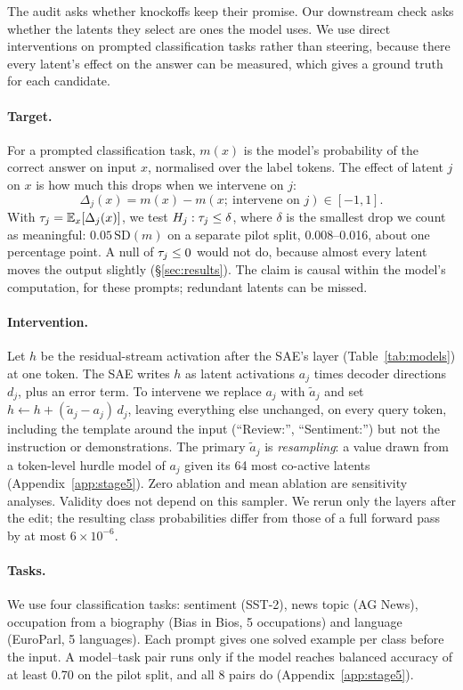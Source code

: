 The audit asks whether knockoffs keep their promise. Our downstream check asks whether the latents they select
are ones the model uses. We use direct interventions on prompted classification tasks rather than steering, because
there every latent's effect on the answer can be measured, which gives a ground
truth for each candidate.

\paragraph{Target.} For a prompted classification task, $m(x)$ is the model's probability of the correct answer on input
$x$, normalised over the label tokens. The effect of latent $j$ on $x$ is how much this drops when we intervene on $j$:
\begin{equation}
\Delta_j(x) = m(x) - m(x;\ \text{intervene on } j) \in [-1, 1].
\end{equation}
With $\tau_j = \mathbb{E}_x[\Delta_j(x)]$, we test $H_j: \tau_j \le \delta$, where $\delta$ is the smallest drop we count as
meaningful: $0.05\,\mathrm{SD}(m)$ on a separate pilot split, 0.008--0.016, about one percentage point. A null of $\tau_j
\le 0$ would not do, because almost every latent moves the output slightly (\S\ref{sec:results}). The claim is causal
within the model's computation, for these prompts; redundant latents can be missed.

\paragraph{Intervention.} Let $h$ be the residual-stream activation after the SAE's layer (Table~\ref{tab:models}) at one
token. The SAE writes $h$ as latent activations $a_j$ times decoder directions $d_j$, plus an error term. To intervene we
replace $a_j$ with $\tilde a_j$ and set $h \leftarrow h + (\tilde a_j - a_j)\, d_j$, leaving everything else unchanged, on every
query token, including the template around the input (``Review:'', ``Sentiment:'') but not the instruction or demonstrations.
The primary $\tilde a_j$ is \emph{resampling}: a value drawn from a token-level hurdle model of $a_j$ given its 64
most co-active latents (Appendix~\ref{app:stage5}). Zero ablation and mean ablation are sensitivity analyses. Validity does
not depend on this sampler. We rerun only the layers after the edit; the resulting class probabilities differ from those of a full forward pass by at most $6\times10^{-6}$.

\paragraph{Tasks.} We use four classification tasks: sentiment (SST-2), news topic (AG News), occupation from a biography (Bias in Bios, 5 occupations) and language (EuroParl, 5 languages). Each prompt gives one solved example per class before the input. A model--task pair runs only if the model reaches balanced accuracy of at least 0.70 on the pilot split, and all 8 pairs do (Appendix~\ref{app:stage5}).

